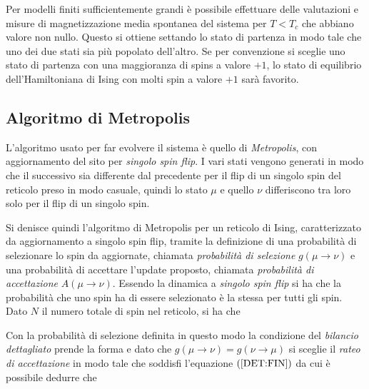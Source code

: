 \documentclass[a4paper,12pt]{article}
\begin{document}
Per modelli finiti sufficientemente grandi è possibile effettuare delle valutazioni e misure di magnetizzazione media spontanea del sistema per $T < T_c$ che abbiano valore non nullo. Questo si ottiene settando lo stato di partenza in modo tale che uno dei due stati sia più popolato dell’altro. Se per convenzione si sceglie uno stato di partenza con una maggioranza di spins a valore $+1$, lo stato di equilibrio dell’Hamiltoniana di Ising con molti spin a valore $+1$ sarà favorito. 

\subsection{Algoritmo di Metropolis}
L'algoritmo usato per far evolvere il sistema \`e quello di \emph{Metropolis}, con aggiornamento del sito per \emph{singolo spin flip}. I vari stati vengono generati in modo che il successivo sia differente dal precedente per il flip di un singolo spin del reticolo preso in modo casuale, quindi lo stato $\mu$ e quello $\nu$ differiscono tra loro solo per il flip di un singolo spin. 

Si denisce quindi l'algoritmo di Metropolis per un reticolo di Ising, caratterizzato da aggiornamento a singolo spin flip, tramite la definizione di una probabilit\`a di selezionare lo spin da aggiornate, chiamata \emph{probabilit\`a di selezione} $g(\mu \to \nu)$ e una probabilit\`a di accettare l'update proposto, chiamata \emph{probabilit\`a di accettazione} $A(\mu \to \nu)$. Essendo la dinamica a \emph{singolo spin flip} si ha che la probabilit\`a che uno spin ha di essere selezionato \`e la stessa per tutti gli spin. Dato $N$ il numero totale di spin nel reticolo, si ha che

Con la probabilità di selezione definita in questo modo la condizione del \emph{bilancio dettagliato} prende la forma
e dato che $g(\mu\to\nu)=g(\nu\to\mu)$ si sceglie il \emph{rateo di accettazione} in modo tale che soddisfi l'equazione $(\ref{DET:FIN})$
da cui è possibile dedurre che
\end{document}
